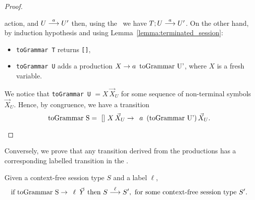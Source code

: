 \begin{proof}
\begin{itemize}
	      action, and $U \LTSderives[a] U'$ then, using the \LTS\ we have
	      $T;U \LTSderives[a] U'$. On the other hand, by induction hypothesis and
	      using Lemma~\ref{lemma:terminated_session}:
	    \begin{itemize}
			\item \lstinline{toGrammar T}  returns \lstinline{[]},
			\item \lstinline{toGrammar U}  adds a production
			$X \rightarrow a \enspace \text{\lstinline{toGrammar U'}}$, where $X$
			is a fresh variable.
		\end{itemize}
		We notice that \lstinline{toGrammar U} $= X \, \vec X_U$ for some sequence of
		non-terminal symbols $\vec X_U$. Hence, by congruence, we have a
		transition
		\[\text{\lstinline{toGrammar S}} = \, \text{\lstinline{[]}} \, X \,
		\vec X_U \rightarrow \enspace a \enspace \text{(\lstinline{toGrammar U'})} \,
		\vec X_U.\]
\end{itemize}
\end{proof}

Conversely, we prove that any transition derived from the productions
has a corresponding labelled transition in the \LTS.

\begin{lemma}
Given a context-free session type $S$ and a label $\ell$,
	\[ \text{if } \text{\lstinline{toGrammar S}} \rightarrow \enspace \ell \enspace
	 \vec Y \text{ then } S \LTSderives[\ell] S', \text{ for some context-free session type $S'$}.\]
\end{lemma}

